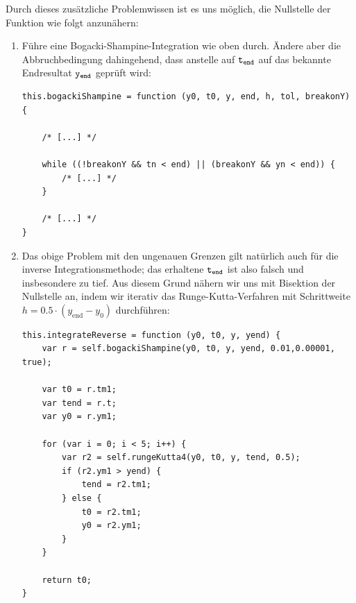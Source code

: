 \documentclass[11pt]{scrreprt} %
\theoremstyle{definition}
\begin{document}
Durch dieses zusätzliche Problemwissen ist es uns möglich, die Nullstelle der Funktion wie folgt anzunähern:
\begin{enumerate}
\item Führe eine Bogacki-Shampine-Integration wie oben durch. Ändere aber die Abbruchbedingung dahingehend, dass anstelle auf $\tt{t_{end}}$ auf das bekannte Endresultat $\tt{y_{end}}$ geprüft wird:

\begin{lstlisting}
this.bogackiShampine = function (y0, t0, y, end, h, tol, breakonY) {

	/* [...] */
		
	while ((!breakonY && tn < end) || (breakonY && yn < end)) {
		/* [...] */
	}

	/* [...] */
}
\end{lstlisting}

\item Das obige Problem mit den ungenauen Grenzen gilt natürlich auch für die inverse Integrationsmethode; das erhaltene $\tt{t_{end}}$ ist also falsch und insbesondere zu tief. Aus diesem Grund nähern wir uns mit Bisektion der Nullstelle an, indem wir iterativ das Runge-Kutta-Verfahren mit Schrittweite $h = 0.5\cdot(y_\text{end} - y_0)$ durchführen:

\begin{lstlisting}
this.integrateReverse = function (y0, t0, y, yend) {
	var r = self.bogackiShampine(y0, t0, y, yend, 0.01,0.00001, true);
		
	var t0 = r.tm1;
	var tend = r.t;
	var y0 = r.ym1;
		
	for (var i = 0; i < 5; i++) {
		var r2 = self.rungeKutta4(y0, t0, y, tend, 0.5);
		if (r2.ym1 > yend) {
			tend = r2.tm1;
		} else {
			t0 = r2.tm1;
			y0 = r2.ym1;
		}
	}

	return t0;
}
\end{lstlisting}

\end{enumerate}



\end{document}
